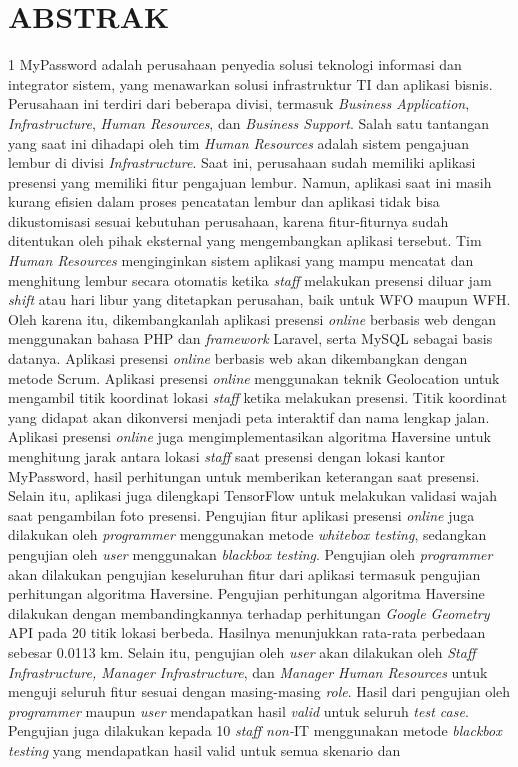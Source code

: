 \chapter*{\centering ABSTRAK}

\begin{spacing}{1}
\noindent MyPassword adalah perusahaan penyedia solusi teknologi informasi dan integrator sistem, yang menawarkan solusi infrastruktur TI dan aplikasi bisnis. Perusahaan ini terdiri dari beberapa divisi, termasuk \textit{Business Application}, \textit{Infrastructure}, \textit{Human Resources}, dan \textit{Business Support}. Salah satu tantangan yang saat ini dihadapi oleh tim \textit{Human Resources} adalah sistem pengajuan lembur di divisi \textit{Infrastructure}. Saat ini, perusahaan sudah memiliki aplikasi presensi yang memiliki fitur pengajuan lembur. Namun, aplikasi saat ini masih kurang efisien dalam proses pencatatan lembur dan aplikasi tidak bisa dikustomisasi sesuai kebutuhan perusahaan, karena fitur-fiturnya sudah ditentukan oleh pihak eksternal yang mengembangkan aplikasi tersebut. Tim \textit{Human Resources} menginginkan sistem aplikasi yang mampu mencatat dan menghitung lembur secara otomatis ketika \textit{staff} melakukan presensi diluar jam \textit{shift} atau hari libur yang ditetapkan perusahan, baik untuk WFO maupun WFH. Oleh karena itu, dikembangkanlah aplikasi presensi \textit{online} berbasis web dengan menggunakan bahasa PHP dan \textit{framework} Laravel, serta MySQL sebagai basis datanya. Aplikasi presensi \textit{online} berbasis web akan dikembangkan dengan metode Scrum. Aplikasi presensi \textit{online} menggunakan teknik Geolocation untuk mengambil titik koordinat lokasi \textit{staff} ketika melakukan presensi. Titik koordinat yang didapat akan dikonversi menjadi peta interaktif dan nama lengkap jalan. Aplikasi presensi \textit{online} juga mengimplementasikan algoritma Haversine untuk menghitung jarak antara lokasi \textit{staff} saat presensi dengan lokasi kantor MyPassword, hasil perhitungan untuk memberikan keterangan saat presensi. Selain itu, aplikasi juga dilengkapi TensorFlow untuk melakukan validasi wajah saat pengambilan foto presensi. Pengujian fitur aplikasi presensi \textit{online} juga dilakukan oleh \textit{programmer} menggunakan metode \textit{whitebox testing}, sedangkan pengujian oleh \textit{user} menggunakan \textit{blackbox testing}. Pengujian oleh \textit{programmer} akan dilakukan pengujian keseluruhan fitur dari aplikasi termasuk pengujian perhitungan algoritma Haversine. Pengujian perhitungan algoritma Haversine dilakukan dengan membandingkannya terhadap perhitungan \textit{Google Geometry} API pada 20 titik lokasi berbeda. Hasilnya menunjukkan rata-rata perbedaan sebesar 0.0113 km. Selain itu, pengujian oleh \textit{user} akan dilakukan oleh \textit{Staff Infrastructure, Manager Infrastructure}, dan \textit{Manager Human Resources} untuk menguji seluruh fitur sesuai dengan masing-masing \textit{role}. Hasil dari pengujian oleh \textit{programmer} maupun \textit{user} mendapatkan hasil \textit{valid} untuk seluruh \textit{test case}. Pengujian juga dilakukan kepada 10 \textit{staff non-}IT menggunakan metode \textit{blackbox testing} yang mendapatkan hasil valid untuk semua skenario dan 
\end{spacing}
